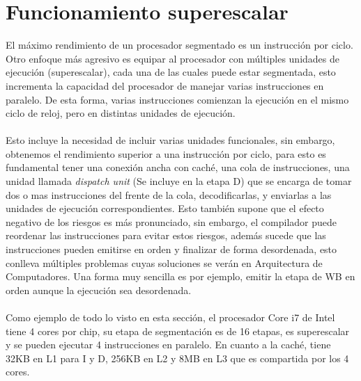 \section{Funcionamiento superescalar}
El máximo rendimiento de un procesador segmentado es un instrucción por ciclo. Otro enfoque más agresivo 
es equipar al procesador con múltiples unidades de ejecución (superescalar), cada una de las cuales puede estar segmentada, esto
incrementa la capacidad del procesador de manejar varias instrucciones en paralelo. De esta forma, varias instrucciones 
comienzan la ejecución en el mismo ciclo de reloj, pero en distintas unidades de ejecución. 
\\ \\
Esto incluye la necesidad de incluir varias unidades funcionales, sin embargo, obtenemos el rendimiento superior a una instrucción por ciclo,
para esto es fundamental tener una conexión ancha con caché, una cola de instrucciones, una unidad llamada \textit{dispatch unit} (Se incluye 
en la etapa D) que se encarga de tomar dos o mas instrucciones del frente de la cola, decodificarlas, y enviarlas a las unidades de ejecución correspondientes.
Esto también supone que el efecto negativo de los riesgos es más pronunciado, sin embargo, el compilador puede reordenar las instrucciones para evitar estos riesgos, 
además sucede que las instrucciones pueden emitirse en orden y finalizar de forma desordenada, esto conlleva múltiples problemas cuyas soluciones se verán en Arquitectura de Computadores.
Una forma muy sencilla es por ejemplo, emitir la etapa de WB en orden aunque la ejecución sea desordenada.
\\ \\ 
Como ejemplo de todo lo visto en esta sección, el procesador Core i7 de Intel tiene 4 cores por chip, su etapa de segmentación es de 16 etapas, es superescalar y 
se pueden ejecutar 4 instrucciones en paralelo. En cuanto a la caché, tiene 32KB en L1 para I y D, 256KB en L2 y 8MB en L3 que es compartida por los 4 cores.












